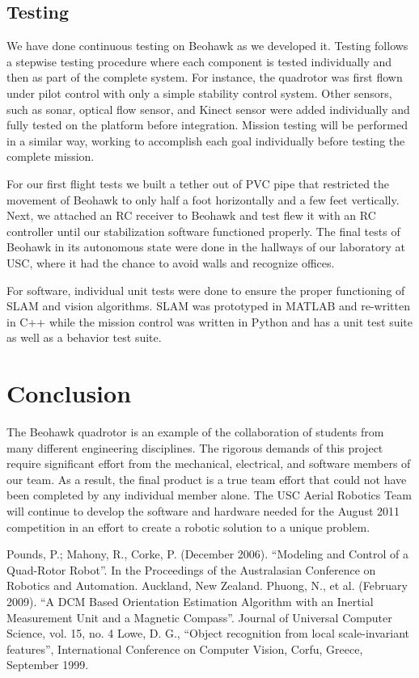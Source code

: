 \documentclass[12pt, letterpaper]{article}
\begin{document}
\subsection{Testing}
We have done continuous testing on Beohawk as we developed it. Testing follows a stepwise testing procedure where each component is tested individually and then as part of the complete system. For instance, the quadrotor was first flown under pilot control with only a simple stability control system. Other sensors, such as sonar, optical flow sensor, and Kinect sensor were added individually and fully tested on the platform before integration. Mission testing will be performed in a similar way, working to accomplish each goal individually before testing the complete mission.

For our first flight tests we built a tether out of PVC pipe that restricted the movement of Beohawk to only half a foot horizontally and a few feet vertically.  Next, we attached an RC receiver to Beohawk and test flew it with an RC controller until our stabilization software functioned properly.  The final tests of Beohawk in its autonomous state were done in the hallways of our laboratory at USC, where it had the chance to avoid walls and recognize offices.

For software, individual unit tests were done to ensure the proper functioning of SLAM and vision algorithms.  SLAM was prototyped in MATLAB and re-written in C++ while the mission control was written in Python and has a unit test suite as well as a behavior test suite. 

\section{Conclusion}
The Beohawk quadrotor is an example of the collaboration of students from many different engineering disciplines. The rigorous demands of this project require significant effort from the mechanical, electrical, and software members of our team. As a result, the final product is a true team effort that could not have been completed by any individual member alone. The USC Aerial Robotics Team will continue to develop the software and hardware needed for the August 2011 competition in an effort to create a robotic solution to a unique problem.



\begin{thebibliography}{10}
Pounds, P.; Mahony, R., Corke, P. (December 2006). ``Modeling and Control of a Quad-Rotor Robot''. In the Proceedings of the Australasian Conference on Robotics and Automation. Auckland, New Zealand.
Phuong, N., et al. (February 2009). ``A DCM Based Orientation Estimation Algorithm with an Inertial Measurement Unit and a Magnetic Compass''. 
Journal of Universal Computer Science, vol. 15, no. 4
Lowe, D. G., ``Object recognition from local scale-invariant features'', International Conference on Computer Vision, Corfu, Greece, September 1999.
\end{thebibliography}
\end{document}
